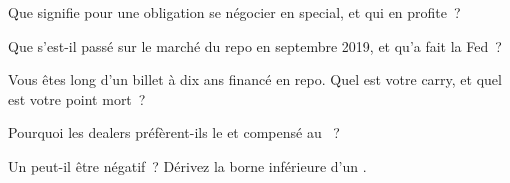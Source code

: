 \begin{interviewq}\label{iq:m2:repo-and-specials:2}
Que signifie pour une obligation se négocier en special, et qui en profite~?
\end{interviewq}

\begin{interviewq}\label{iq:m2:repo-and-specials:3}
Que s'est-il passé sur le marché du repo en septembre 2019, et qu'a fait la Fed~?
\end{interviewq}

\begin{interviewq}\label{iq:m2:repo-and-specials:4}
Vous êtes long d'un billet à dix ans financé en repo. Quel est votre carry, et quel est votre
point mort~?
\end{interviewq}

\begin{interviewq}\label{iq:m2:repo-and-specials:5}
Pourquoi les dealers préfèrent-ils le  et compensé au ~?
\end{interviewq}

\begin{interviewq}\label{iq:m2:repo-and-specials:6}
Un  peut-il être négatif~? Dérivez la borne inférieure d'un .
\end{interviewq}
